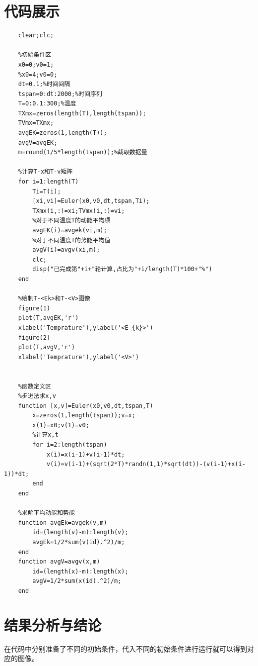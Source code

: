 \documentclass[UTF8,a4paper,10pt]{ctexart}
\begin{document}
\section{代码展示}
\lstset{language=matlab}
\begin{lstlisting}
    clear;clc;

    %初始条件区
    x0=0;v0=1;
    %x0=4;v0=0;
    dt=0.1;%时间间隔
    tspan=0:dt:2000;%时间序列
    T=0:0.1:300;%温度
    TXmx=zeros(length(T),length(tspan));
    TVmx=TXmx;
    avgEK=zeros(1,length(T));
    avgV=avgEK;
    m=round(1/5*length(tspan));%截取数据量
    
    %计算T-x和T-v矩阵
    for i=1:length(T)
        Ti=T(i);
        [xi,vi]=Euler(x0,v0,dt,tspan,Ti);
        TXmx(i,:)=xi;TVmx(i,:)=vi;
        %对于不同温度T的动能平均项
        avgEK(i)=avgek(vi,m);
        %对于不同温度T的势能平均值
        avgV(i)=avgv(xi,m);
        clc;
        disp("已完成第"+i+"轮计算,占比为"+i/length(T)*100+"%")
    end
    
    %绘制T-<Ek>和T-<V>图像
    figure(1)
    plot(T,avgEK,'r')
    xlabel('Temprature'),ylabel('<E_{k}>')
    figure(2)
    plot(T,avgV,'r')
    xlabel('Temprature'),ylabel('<V>')
    
    
    %函数定义区
    %步进法求x,v
    function [x,v]=Euler(x0,v0,dt,tspan,T)
        x=zeros(1,length(tspan));v=x;
        x(1)=x0;v(1)=v0;
        %计算x,t
        for i=2:length(tspan)
            x(i)=x(i-1)+v(i-1)*dt;
            v(i)=v(i-1)+(sqrt(2*T)*randn(1,1)*sqrt(dt))-(v(i-1)+x(i-1))*dt;
        end
    end
    
    %求解平均动能和势能
    function avgEk=avgek(v,m)
        id=(length(v)-m):length(v);
        avgEk=1/2*sum(v(id).^2)/m;
    end
    function avgV=avgv(x,m)
        id=(length(x)-m):length(x);
        avgV=1/2*sum(x(id).^2)/m;
    end
\end{lstlisting}

\section{结果分析与结论}
在代码中分别准备了不同的初始条件，代入不同的初始条件进行运行就可以得到对应的图像。
\end{document}
